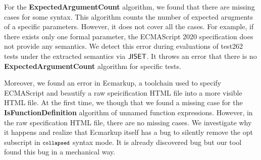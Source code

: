 For the \textbf{ExpectedArgumentCount} algorithm, we found that
there are missing cases for some syntax. This algorithm counts the number of
expected arugments of a specific parameters. However, it does not cover all
the cases. For example, if there exists only one formal parameter,
the ECMAScript 2020 specification does not provide any semantics.
We detect this error during evaluations of test262 tests under
the extracted semantics via \( \text{\sf JISET} \). It throws an error that there
is no \textbf{ExpectedArgumentCount} algorithm for specific tests.

Moreover, we found an error in \textsf{Ecmarkup}, a toolchain used to
specify ECMAScript and beautify a raw speicification HTML file
into a more visible HTML file. At the first time, we though that
we found a missing case for the \textbf{IsFunctionDefinition}
algorithm of unnamed function expressions. However, in the
raw specification HTML file, there are no missing cases. We investigate
why it happens and realize that \textsf{Ecmarkup} itself has
a bug to silently remove the {\small opt} subscript in \( \texttt{\footnotesize collapsed} \)
syntax mode. It is already discovered bug but our tool found this bug
in a mechanical way.
